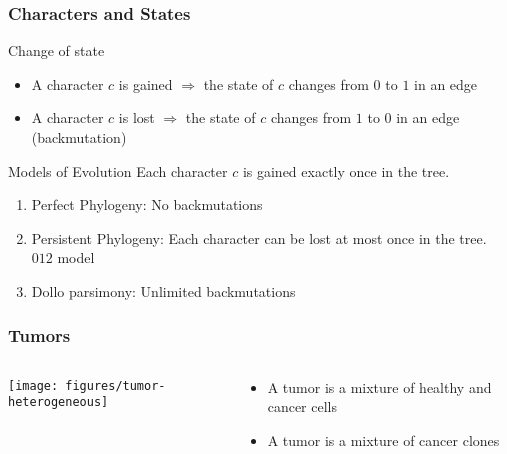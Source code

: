 






\begin{frame}
\frametitle{Characters and States}

\begin{block}{Change of state}
  \begin{itemize} 
\item  A character $c$ is \alert{gained} $\Rightarrow$  the state of $c$ changes from $0$ to $1$
  in an edge
\item  A character $c$ is \alert{lost} $\Rightarrow$  the state of $c$ changes from $1$ to $0$
  in an edge (\alert{backmutation})
\end{itemize}
\end{block}

\begin{block}{Models of Evolution}
  Each character $c$ is gained \alert{exactly once} in the tree.
\begin{enumerate}
\item
  Perfect Phylogeny:  No backmutations
\item
  Persistent Phylogeny: Each character can be lost at most once in the tree.
\alert{$012$ model}
\item
  \alert{Dollo} parsimony: 
  Unlimited backmutations
\end{enumerate}
\end{block}
\end{frame}



\begin{frame}
\frametitle{Tumors}
\begin{columns}
\begin{column}{0.75\textwidth}
\centering
\texttt{[image: figures/tumor-heterogeneous]}
\end{column}
\begin{column}{0.25\textwidth}
\begin{itemize}
\item
A \alert{tumor} is a mixture of healthy and cancer cells
\item
A \alert{tumor} is a mixture of cancer clones
\end{itemize}
\end{column}
\end{columns}
\end{frame}


